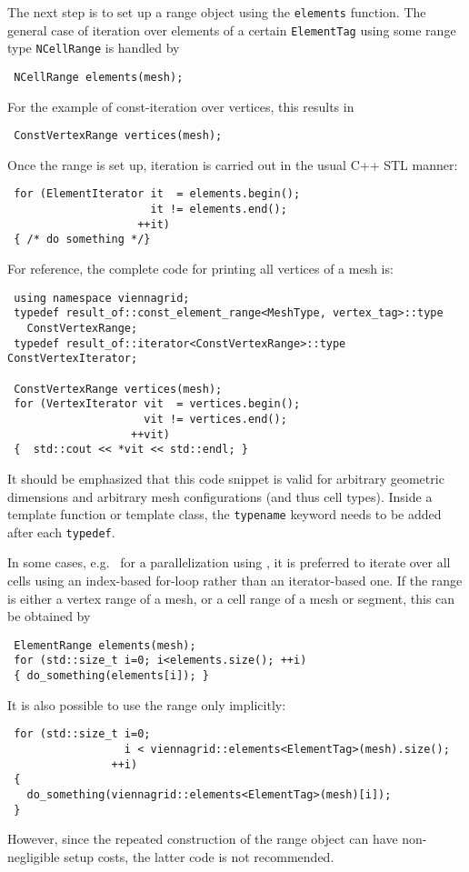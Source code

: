 The next step is to set up a range object using the \lstinline|elements| function.
The general case of iteration over elements of a certain \lstinline|ElementTag| using some range type \lstinline|NCellRange| is handled by
\begin{lstlisting}
 NCellRange elements(mesh);
\end{lstlisting}
For the example of const-iteration over vertices, this results in
\begin{lstlisting}
 ConstVertexRange vertices(mesh);
\end{lstlisting}

Once the range is set up, iteration is carried out in the usual C++ STL manner:
\begin{lstlisting}
 for (ElementIterator it  = elements.begin();
                      it != elements.end();
                    ++it)
 { /* do something */}
\end{lstlisting}
For reference, the complete code for printing all vertices of a mesh is:
\begin{lstlisting}
 using namespace viennagrid;
 typedef result_of::const_element_range<MeshType, vertex_tag>::type
   ConstVertexRange;
 typedef result_of::iterator<ConstVertexRange>::type ConstVertexIterator;

 ConstVertexRange vertices(mesh);
 for (VertexIterator vit  = vertices.begin();
                     vit != vertices.end();
                   ++vit)
 {  std::cout << *vit << std::endl; }
\end{lstlisting}
It should be emphasized that this code snippet is valid for arbitrary geometric dimensions and arbitrary mesh configurations (and thus cell types). Inside a template function or template class, the \lstinline|typename| keyword needs to be added after each \lstinline|typedef|.



In some cases, e.g.~ for a parallelization using \OpenMP \cite{openmp}, it is preferred to iterate over all cells using an index-based for-loop rather than an iterator-based one.
If the range is either a vertex range of a mesh, or a cell range of a mesh or segment, this can be obtained by
\begin{lstlisting}
 ElementRange elements(mesh);
 for (std::size_t i=0; i<elements.size(); ++i)
 { do_something(elements[i]); }
\end{lstlisting}
It is also possible to use the range only implicitly:
\begin{lstlisting}
 for (std::size_t i=0;
                  i < viennagrid::elements<ElementTag>(mesh).size();
                ++i)
 {
   do_something(viennagrid::elements<ElementTag>(mesh)[i]);
 }
\end{lstlisting}
However, since the repeated construction of the range object can have non-negligible setup costs, the latter code is not recommended.

